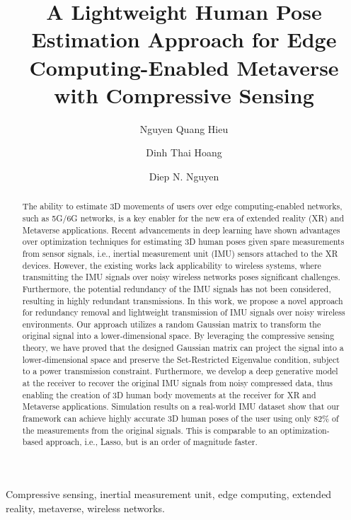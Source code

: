 \documentclass[conference, 10pt]{IEEEtran}
\begin{document}
\title{\huge A Lightweight Human Pose Estimation Approach for Edge Computing-Enabled Metaverse with Compressive Sensing}
\author{Nguyen Quang Hieu}
\author{Dinh Thai Hoang}
\author{Diep N. Nguyen}
\maketitle
\begin{abstract}
The ability to estimate 3D movements of users over edge computing-enabled networks, such as 5G/6G networks, is a key enabler for the new era of extended reality (XR) and Metaverse applications. Recent advancements in deep learning have shown advantages over optimization techniques for estimating 3D human poses given spare measurements from sensor signals, i.e., inertial measurement unit (IMU) sensors attached to the XR devices. However, the existing works lack applicability to wireless systems, where transmitting the IMU signals over noisy wireless networks poses significant challenges. Furthermore, the potential redundancy of the IMU signals has not been considered, resulting in highly redundant transmissions. In this work, we propose a novel approach for redundancy removal and lightweight transmission of IMU signals over noisy wireless environments. Our approach utilizes a random Gaussian matrix to transform the original signal into a lower-dimensional space. By leveraging the compressive sensing theory, we have proved that the designed Gaussian matrix can project the signal into a lower-dimensional space and preserve the Set-Restricted Eigenvalue condition, subject to a power transmission constraint. Furthermore, we develop a deep generative model at the receiver to recover the original IMU signals from noisy compressed data, thus enabling the creation of 3D human body movements at the receiver for XR and Metaverse applications. Simulation results on a real-world IMU dataset show that our framework can achieve highly accurate 3D human poses of the user using only $82\%$ of the measurements from the original signals. This is comparable to an optimization-based approach, i.e., Lasso, but is an order of magnitude faster.
\end{abstract}

\begin{IEEEkeywords}
Compressive sensing, inertial measurement unit, edge computing, extended reality, metaverse, wireless networks.
\end{IEEEkeywords}
\end{document}
